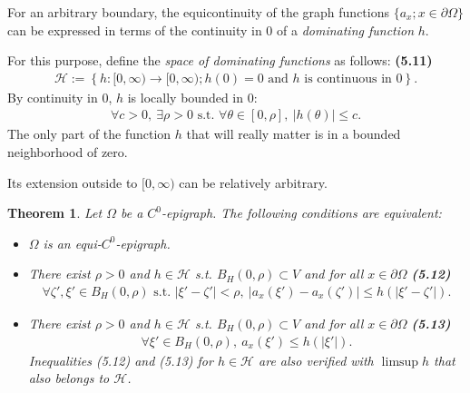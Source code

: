 \documentclass{book}
\numberwithin{equation}{section}
\newtheorem{theorem}{Theorem}[section]
\begin{document}
\begin{enumerate}
    For an arbitrary boundary, the equicontinuity of the graph functions $\{a_x;x\in\partial\Omega\}$ can be expressed in terms of the continuity in 0 of a \textit{dominating function} $h$.
    
    For this purpose, define the \textit{space of dominating functions} as follows: \textbf{(5.11)}
    \begin{align*}
        \mathcal{H} := \left\{h:[0,\infty)\to[0,\infty);h(0) = 0 \mbox{ and } h \mbox{ is continuous in } 0\right\}.
    \end{align*}
    By continuity in 0, $h$ is locally bounded in 0:
    \begin{align*}
        \forall c > 0,\ \exists\rho > 0 \mbox{ s.t. } \forall\theta\in[0,\rho],\ |h(\theta)|\le c.
    \end{align*}
    The only part of the function $h$ that will really matter is in a bounded neighborhood of zero.
    
    Its extension outside to $[0,\infty)$ can be relatively arbitrary.
    
    \begin{theorem}
        Let $\Omega$ be a $C^0$-epigraph. The following conditions are equivalent:
        \begin{itemize}
            \item[(i)] $\Omega$ is an equi-$C^0$-epigraph.
            \item[(ii)] There exist $\rho > 0$ and $h\in\mathcal{H}$ s.t. $B_H(0,\rho)\subset V$ and for all $x\in\partial\Omega$ \textbf{(5.12)}
            \begin{align*}
                \forall\zeta',\xi'\in B_H(0,\rho) \mbox{ s.t. } |\xi' - \zeta'| < \rho,\ |a_x(\xi') - a_x(\zeta')|\le h(|\xi' - \zeta'|).
            \end{align*}
            \item[(iii)] There exist $\rho > 0$ and $h\in\mathcal{H}$ s.t. $B_H(0,\rho)\subset V$ and for all $x\in\partial\Omega$ \textbf{(5.13)}
            \begin{align*}
                \forall\xi'\in B_H(0,\rho),\ a_x(\xi')\le h(|\xi'|).
            \end{align*}
            Inequalities (5.12) and (5.13) for $h\in\mathcal{H}$ are also verified with $\limsup h$ that also belongs to $\mathcal{H}$.
        \end{itemize}
    \end{theorem}


\end{enumerate}
\end{document}
